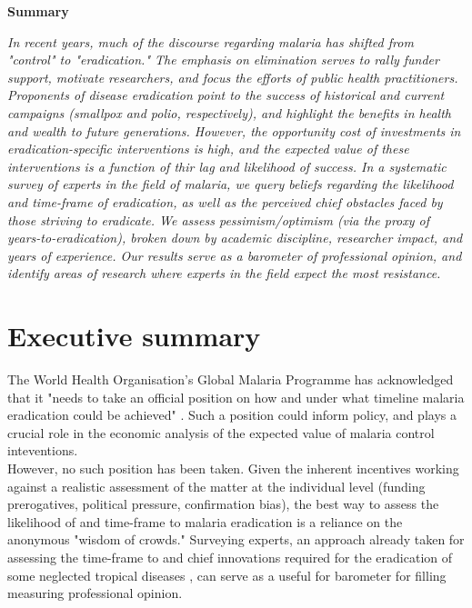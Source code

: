 \documentclass{article}
\begin{document}
\begin{changemargin}{3cm}{3cm} 

\begin{center}
\textbf{Summary}
\end{center}

\emph{In recent years, much of the discourse regarding malaria has shifted from "control" to "eradication." The emphasis on elimination serves to rally funder support, motivate researchers, and focus the efforts of public health practitioners. Proponents of disease eradication point to the success of historical and current campaigns (smallpox and polio, respectively), and highlight the benefits in health and wealth to future generations. However, the opportunity cost of investments in eradication-specific interventions is high, and the expected value of these interventions is a function of thir lag and likelihood of success. In a systematic survey of experts in the field of malaria, we query beliefs regarding the likelihood and time-frame of eradication, as well as the perceived chief obstacles faced by those striving to eradicate. We assess pessimism/optimism (via the proxy of years-to-eradication), broken down by academic discipline, researcher impact, and years of experience. Our results serve as a barometer of professional opinion, and identify areas of research where experts in the field expect the most resistance.}
\end{changemargin}
\vfill  

\newpage

\section*{Executive summary}

The World Health Organisation's Global Malaria Programme has acknowledged that it "needs to take an official position on how and under what timeline malaria eradication could be achieved" \cite{WHO2015}. Such a position could inform policy, and plays a crucial role in the economic analysis of the expected value of malaria control inteventions. \\

\noindent However, no such position has been taken. Given the inherent incentives working against a realistic assessment of the matter at the individual level (funding prerogatives, political pressure, confirmation bias), the best way to assess the likelihood of and time-frame to malaria eradication is a reliance on the anonymous "wisdom of crowds." Surveying experts, an approach already taken for assessing the time-frame to and chief innovations required for the eradication of some neglected tropical diseases \cite{Keenan2013}, can serve as a useful for barometer for filling measuring professional opinion. \\
\end{document}
